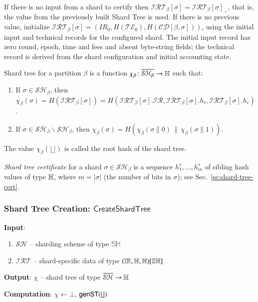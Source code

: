 If there is no input from a shard to certify then $\mathcal{IRT}_\beta[\sigma] = \mathcal{IRT}_\beta[\sigma]_-$, that is, the value from the previously built Shard Tree is used. If there is no previous value, initialize $\mathcal{IRT}_\beta[\sigma]=(IR_0,H(\mathcal{TE}_0),H(\mathcal{CD}[\beta,\sigma]))$, using the initial input and technical records for the configured shard. The initial input record has zero round, epoch, time and fees and absent byte-string fields; the technical record is derived from the shard configuration and initial accounting state.

Shard tree for a partition $\beta$ is a function $\chi_\beta \colon \overline{\mathcal{SH}_\beta} \to \mathbb{H}$ such that:
\begin{enumerate}
	\item If $\sigma\in\mathcal{SH}_\beta$, then $\chi_\beta(\sigma) = H(\mathcal{IRT}_\beta[\sigma]) =H(\mathcal{IRT}_\beta[\sigma].\mathcal{IR},\mathcal{IRT}_\beta[\sigma].h_t,\mathcal{IRT}_\beta[\sigma].h_c)$.
	\item If $\sigma\in \overline{\mathcal{SH}_\beta}\backslash\mathcal{SH}_\beta$, then
		$\chi_\beta(\sigma) = H(\chi_\beta(\sigma\| 0)\, \mathbin{\|} \,\chi_\beta(\sigma\| 1))$.
\end{enumerate}
The value $\chi_\beta(\lfloor\!\rfloor)$ is called the root hash of the shard tree.

\emph{Shard tree certificate} for a shard $\sigma\in \mathcal{SH}_\beta$ is a sequence $h^s_1, \ldots, h^s_m$ of sibling hash values of type $\mathbb{H}$, where $m=|\sigma|$ (the number of bits in $\sigma$); see Sec.~\ref{se:shard-tree-cert}.

\subsubsection{Shard Tree Creation: $\mathsf{CreateShardTree}$}\label{se:create-shard-tree}

\textbf{Input}:
\begin{enumerate}
	\item $\mathcal{SH}$ -- sharding scheme of type $\mathbb{SH}$
	\item $\mathcal{IRT}$ -- shard-specific data of type $(\mathbb{IR},\mathbb{H},\mathbb{H})[\mathbb{SH}]$
\end{enumerate}
\textbf{Output}: $\chi$ -- shard tree of type $\overline{\mathcal{SH}}\to \mathbb{H}$

\textbf{Computation}:
$\chi\gets \bot$, $\mathsf{genST}(\lfloor\!\rfloor)$

